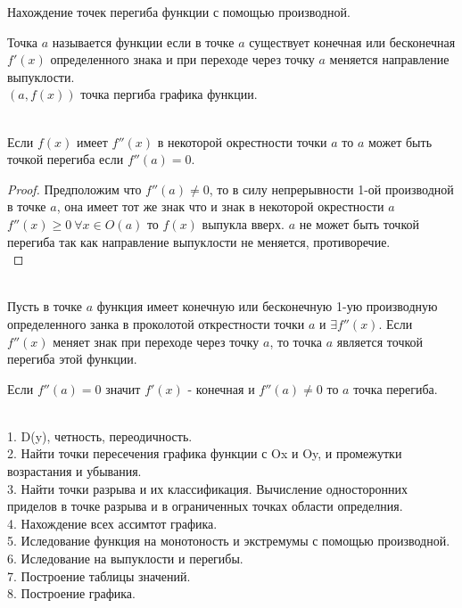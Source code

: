 \begin{title}
  Нахождение точек перегиба функции с помощью производной.
\end{title}

\begin{defin}
  Точка $a$ называется  функции если в точке
  $a$ существует конечная или бесконечная $f'(x)$ определенного знака
  и при переходе через точку $a$ меняется направление выпуклости.\\
  $(a, f(x))$ точка пергиба графика функции.
\end{defin}

\\
Если $f(x)$ имеет $f''(x)$ в некоторой окрестности точки $a$ то $a$ может быть
точкой перегиба если $f''(a) = 0$.\\

\begin{proof}
  Предположим что $f''(a)\not= 0$, то в силу непрерывности 1-ой производной
  в точке $a$, она имеет тот же знак что и знак в некоторой
  окрестности $a$ $f''(x)\ge 0 ~ \forall x\in O(a)$ то $f(x)$ выпукла вверх.
  $a$ не может быть точкой перегиба так как направление выпуклости не меняется,
  противоречие.\\
\end{proof}

\\
Пусть в точке $a$ функция имеет конечную или бесконечную 1-ую производную
определенного занка в проколотой открестности точки $a$ и $\exists f''(x)$.
Если $f''(x)$ меняет знак при переходе через точку $a$, то точка $a$ является
точкой перегиба этой функции.\\

\begin{theorem}
  Если $f''(a) = 0$ значит $f'(x)$ - конечная и $f''(a) \not= 0$ то
  $a$ точка перегиба.\\
\end{theorem}

\\
1. D(y), четность, переодичность.\\
2. Найти точки пересечения графика функции с Ox и Oy, и промежутки возрастания
  и убывания.\\
3. Найти точки разрыва и их классификация. Вычисление односторонних приделов
  в точке разрыва и в ограниченных точках области определния.\\
4. Нахождение всех ассимтот графика.\\
5. Иследование функция на монотоность и экстремумы с помощью производной.\\
6. Иследование на выпуклости и перегибы.\\
7. Построение таблицы значений.\\
8. Построение графика.\\